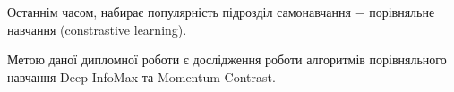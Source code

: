 
Останнім часом, набирає популярність підрозділ самонавчання $-$ порівняльне навчання (constrastive learning).

Метою даної дипломної роботи є дослідження роботи алгоритмів порівняльного навчання Deep InfoMax та Momentum Contrast.

